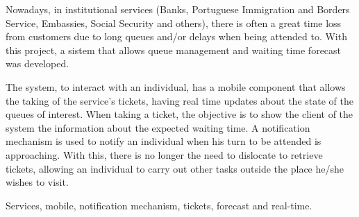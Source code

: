 \abstractEN %

Nowadays, in institutional services (Banks, Portuguese Immigration and Borders Service, Embassies, Social Security and others), there is often a great time loss from customers due to long queues and/or delays when being attended to. With this project, a sistem that allows queue management and waiting time forecast was developed.
	
The system, to interact with an individual, has a mobile component that allows the taking of the service’s tickets, having real time updates about the state of the queues of interest. When taking a ticket, the objective is to show the client of the system the information about the expected waiting time. A notification mechanism is used to notify an individual when his turn to be attended is approaching. With this, there is no longer the need to dislocate to retrieve tickets, allowing an individual to carry out other tasks outside the place he/she wishes to visit. 


\begin{keywords}
Services, mobile, notification mechanism, tickets, forecast and real-time.
\end{keywords} 
